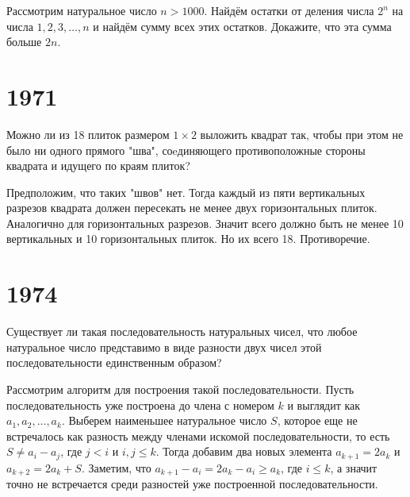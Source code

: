 \documentclass[11pt, a4paper]{common/document_template}
\begin{document}
\begin{exercise}[M33]
Рассмотрим натуральное число $n > 1000$. Найдём остатки от деления числа $2^{n}$ на числа $1, 2, 3, \dots, n$ и найдём сумму всех этих остатков. Докажите, что эта сумма больше $2n$.
\end{exercise}

\begin{Solution}

\end{Solution}

\chapter{1971}

\begin{exercise}[63]
Можно ли из 18 плиток размером $1 \times 2$ выложить квадрат так, чтобы при этом не было ни одного прямого "шва", соeдиняющего противоположные стороны квадрата и идущего по краям плиток?
\end{exercise}

\begin{Solution}
Предположим, что таких "швов" нет. Тогда каждый из пяти вертикальных разрезов квадрата должен пересекать не менее двух горизонтальных плиток. Аналогично для горизонтальных разрезов. Значит всего должно быть не менее 10 вертикальных и 10 горизонтальных плиток. Но их всего 18. Противоречие. 
\end{Solution}

\chapter{1974}

\begin{exercise}[287]
Существует ли такая последовательность натуральных чисел, что любое натуральное число представимо в виде разности двух чисел этой последовательности единственным образом?
\end{exercise}

\begin{Solution}
Рассмотрим алгоритм для построения такой последовательности. Пусть последовательность уже построена до члена с номером $k$ и выглядит как $a_{1}, a_{2}, \dots, a_{k}$. Выберем наименьшее натуральное число $S$, которое еще не встречалось как разность между членами искомой последовательности, то есть $S \neq a_{i} - a_{j}$, где $j < i$ и $i, j \leqslant k$. Тогда добавим два новых элемента $a_{k+1} = 2a_{k}$ и $a_{k+2} = 2a_{k} + S$. Заметим, что $a_{k+1} - a_{i} = 2a_{k} - a_{i} \geqslant a_{k}$, где $i \leqslant k$, а значит точно не встречается среди разностей уже построенной последовательности. 
\end{Solution}
\end{document}
